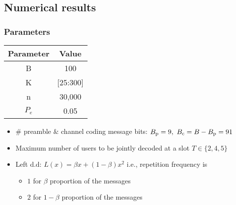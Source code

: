 \subsection{Numerical results}
\begin{frame}\frametitle{Parameters}
\centering
\begin{tabular}{c | c}
Parameter & Value\\
\hline\hline
B & 100\\
K & [25:300]\\
n & 30,000\\
$P_e$ & 0.05\\
\end{tabular}
\vspace{5ex}

\pause

\begin{itemize}
\item $\#$ preamble $\&$ channel coding message bits: $B_{\mathrm{p}}=9,~B_{\mathrm{c}}=B-B_{\mathrm{p}}=91$
\item Maximum number of users to be jointly decoded at a slot $T\in\{2,4,5\}$
\item Left d.d: $L(x)=\beta x+(1-\beta)x^2$ i.e., repetition frequency is
\begin{itemize}
	\item  $1$ for $\beta$ proportion of the messages
	\item $2$ for $1-\beta$ proportion of the messages
\end{itemize}
\end{itemize}
\end{frame}

